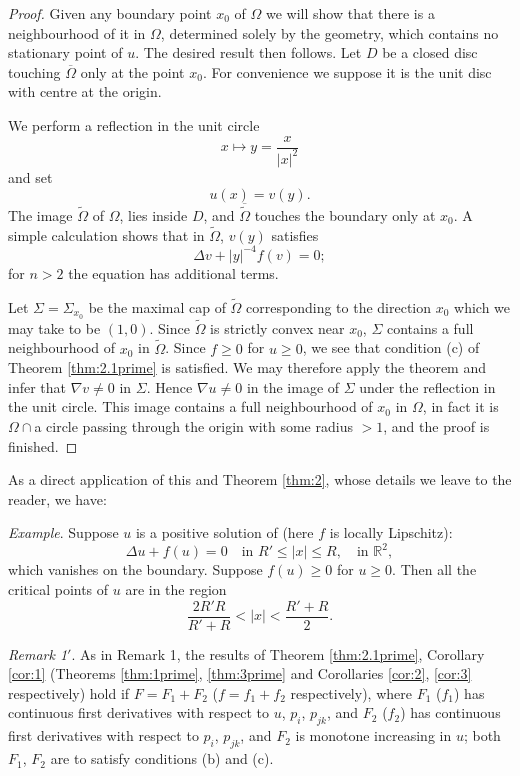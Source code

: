\begin{proof}
  Given any boundary point $x_0$ of $\Omega$ we will show that there is a neighbourhood
  of it in $\Omega$, determined solely by the geometry, which contains no stationary point of $u$.
  The desired result then follows. Let $D$ be a closed disc touching $\overline{\Omega}$
  only at the point $x_0$. For convenience we suppose it is the unit disc with centre at
  the origin.

  We perform a reflection in the unit circle
  \[x\longmapsto y = \frac{x}{|x|^2}\]
  and set
  \[u(x) = v(y).\]
  The image $\widetilde{\Omega}$ of $\Omega$, lies inside $D$, and $\overline{\widetilde{\Omega}}$
  touches the boundary only at $x_0$.
  A simple calculation shows that in $\widetilde{\Omega}$, $v(y)$ satisfies
  \begin{equation}\label{eq:2.7prime}
    \Delta v + |y|^{-4}f(v) = 0; \tag{$2.7'$}
  \end{equation}
  for $n>2$ the equation has additional terms.

  Let $\Sigma = \Sigma_{x_0}$ be the maximal cap of $\widetilde{\Omega}$
  corresponding to the direction $x_0$ which we may take to be $(1,0)$.
  Since $\widetilde{\Omega}$ is strictly convex near $x_0$,
  $\Sigma$ contains a full neighbourhood of $x_0$ in $\widetilde{\Omega}$.
  Since $f\geq 0$ for $u\geq 0$, we see that condition (c) of Theorem \ref{thm:2.1prime} 
  is satisfied. We may therefore apply the theorem and infer that
  $\nabla v\neq 0$ in $\Sigma$. Hence $\nabla u\neq 0$ in the image of $\Sigma$
  under the reflection in the unit circle. 
  This image contains a full neighbourhood of $x_0$ in $\Omega$,
  in fact it is $\Omega\cap${a circle passing through the origin with some radius $>1$},
  and the proof is finished.
\end{proof}

As a direct application of this and Theorem \ref{thm:2},
whose details we leave to the reader, we have:

\textit{Example}. Suppose $u$ is a positive solution of (here $f$ is locally Lipschitz):
\[\Delta u + f(u) = 0\quad \text{in } R'\leq |x| \leq R,\quad \text{in } \mathbb{R}^2,\]
which vanishes on the boundary. Suppose $f(u)\geq 0$ for $u\geq 0$.
Then all the critical points of $u$ are in the region
\[\frac{2R'R}{R'+R} < |x| < \frac{R'+R}{2}.\]

\textit{Remark 1$'$}.
As in Remark 1, the results of Theorem \ref{thm:2.1prime}, Corollary \ref{cor:1}
(Theorems \ref{thm:1prime}, \ref{thm:3prime} and
Corollaries \ref{cor:2}, \ref{cor:3} respectively) hold if $F = F_1+F_2$
($f = f_1 + f_2$ respectively), where $F_1$ ($f_1$) has continuous first derivatives
with respect to $u$, $p_i$, $p_{jk}$, and $F_2$ ($f_2$) has continuous first derivatives
with respect to $p_i$, $p_{jk}$, and $F_2$ is monotone increasing in $u$;
both $F_1$, $F_2$ are to satisfy conditions (b) and (c).

